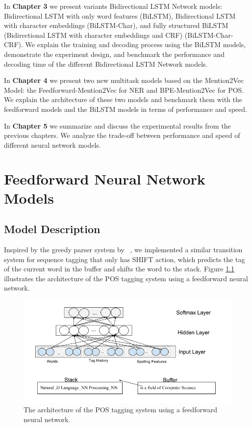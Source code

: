\documentclass{sfuthesis}
\begin{document}
In \textbf{Chapter 3} we present variants Bidirectional LSTM Network models: Bidirectional LSTM with only word features (BiLSTM), Bidirectional LSTM with character embeddings (BiLSTM-Char), and fully structured BiLSTM (Bidirectional LSTM with character embeddings and CRF) (BiLSTM-Char-CRF). We explain the training and decoding process using the BiLSTM models, demonstrate the experiment design, and benchmark the performance and decoding time of the different Bidirectional LSTM Network models.

In \textbf{Chapter 4} we present two new multitask models based on the Mention2Vec Model: the Feedforward-Mention2Vec for NER and BPE-Mention2Vec for POS. We explain the architecture of these two models and benchmark them with the feedforward models and the BiLSTM models in terms of performance and speed.

In \textbf{Chapter 5} we summarize and discuss the experimental results from the previous chapters. We analyze the trade-off between performance and speed of different neural network models.

\chapter{Feedforward Neural Network Models}

\section{Model Description}
\label{Feedforward-CRF}
Inspired by the greedy parser system by ~\cite{chen2014fast}, we implemented a similar transition system for sequence tagging that only has SHIFT action, which predicts the tag of the current word in the buffer and shifts the word to the stack. Figure \ref{fig:greedypos} illustrates the architecture of the POS tagging system using a feedforward neural network.

\begin{figure}
  \centering
  \includegraphics[scale=0.6]{greedypos.png}
 \caption{The architecture of the POS tagging system using a feedforward neural network.}
  \label{fig:greedypos}
\end{figure}
\end{document}
